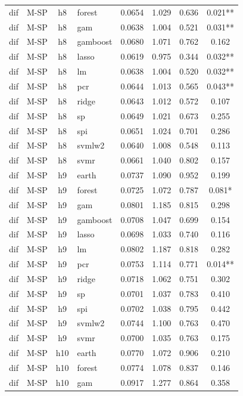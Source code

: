 \begin{ThreePartTable}
\begin{longtable}[t]{llclcccc}
dif & M-SP & h8 & forest & 0.0654 & 1.029 & 0.636 & 0.021**\\
dif & M-SP & h8 & gam & 0.0638 & 1.004 & 0.521 & 0.031**\\
dif & M-SP & h8 & gamboost & 0.0680 & 1.071 & 0.762 & 0.162\\
dif & M-SP & h8 & lasso & 0.0619 & 0.975 & 0.344 & 0.032**\\
dif & M-SP & h8 & lm & 0.0638 & 1.004 & 0.520 & 0.032**\\
dif & M-SP & h8 & pcr & 0.0644 & 1.013 & 0.565 & 0.043**\\
dif & M-SP & h8 & ridge & 0.0643 & 1.012 & 0.572 & 0.107\\
dif & M-SP & h8 & sp & 0.0649 & 1.021 & 0.673 & 0.255\\
dif & M-SP & h8 & spi & 0.0651 & 1.024 & 0.701 & 0.286\\
dif & M-SP & h8 & svmlw2 & 0.0640 & 1.008 & 0.548 & 0.113\\
dif & M-SP & h8 & svmr & 0.0661 & 1.040 & 0.802 & 0.157\\
\addlinespace
dif & M-SP & h9 & earth & 0.0737 & 1.090 & 0.952 & 0.199\\
dif & M-SP & h9 & forest & 0.0725 & 1.072 & 0.787 & 0.081*\\
dif & M-SP & h9 & gam & 0.0801 & 1.185 & 0.815 & 0.298\\
dif & M-SP & h9 & gamboost & 0.0708 & 1.047 & 0.699 & 0.154\\
dif & M-SP & h9 & lasso & 0.0698 & 1.033 & 0.740 & 0.116\\
dif & M-SP & h9 & lm & 0.0802 & 1.187 & 0.818 & 0.282\\
dif & M-SP & h9 & pcr & 0.0753 & 1.114 & 0.771 & 0.014**\\
dif & M-SP & h9 & ridge & 0.0718 & 1.062 & 0.751 & 0.302\\
dif & M-SP & h9 & sp & 0.0701 & 1.037 & 0.783 & 0.410\\
dif & M-SP & h9 & spi & 0.0702 & 1.038 & 0.795 & 0.442\\
dif & M-SP & h9 & svmlw2 & 0.0744 & 1.100 & 0.763 & 0.470\\
dif & M-SP & h9 & svmr & 0.0700 & 1.035 & 0.763 & 0.175\\
\addlinespace
dif & M-SP & h10 & earth & 0.0770 & 1.072 & 0.906 & 0.210\\
dif & M-SP & h10 & forest & 0.0774 & 1.078 & 0.837 & 0.146\\
dif & M-SP & h10 & gam & 0.0917 & 1.277 & 0.864 & 0.358\\

\end{longtable}
\end{ThreePartTable}
